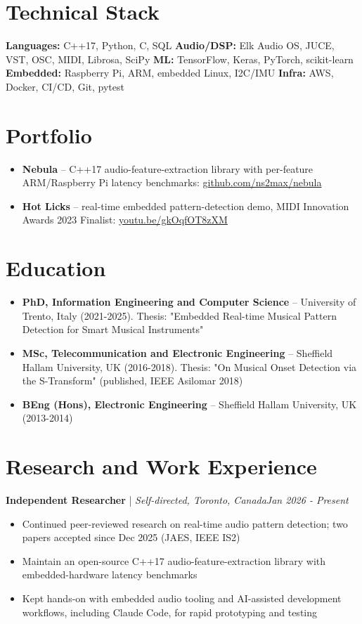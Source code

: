 \documentclass[11pt]{article}
\newenvironment{cvrole}[5]{%
  \par\noindent\textbf{\large #1} | \textit{\small #2, #3}\hfill \textit{\small #4 - #5}\par
  \begin{itemize}[leftmargin=2em, itemsep=-0.3em, topsep=-0.5em]%
}{%
  \end{itemize}\par\noindent\mbox{}\par\vspace{0.1em}%
}
\begin{document}
\section*{Technical Stack}
\textbf{Languages:} C++17, Python, C, SQL \quad
\textbf{Audio/DSP:} Elk Audio OS, JUCE, VST, OSC, MIDI, Librosa, SciPy \quad
\textbf{ML:} TensorFlow, Keras, PyTorch, scikit-learn \quad
\textbf{Embedded:} Raspberry Pi, ARM, embedded Linux, I2C/IMU \quad
\textbf{Infra:} AWS, Docker, CI/CD, Git, pytest

\section*{Portfolio}
\begin{itemize}[leftmargin=1.5em, itemsep=-0.2em]
    \item \textbf{Nebula} -- C++17 audio-feature-extraction library with per-feature ARM/Raspberry Pi latency benchmarks: \href{https://github.com/ns2max/nebula}{github.com/ns2max/nebula}
    \item \textbf{Hot Licks} -- real-time embedded pattern-detection demo, MIDI Innovation Awards 2023 Finalist: \href{https://youtu.be/gkOqfOT8zXM}{youtu.be/gkOqfOT8zXM}
\end{itemize}

\section*{Education}
\begin{itemize}[leftmargin=1.5em, itemsep=-0.2em]
    \item \textbf{PhD, Information Engineering and Computer Science} -- University of Trento, Italy (2021-2025). Thesis: "Embedded Real-time Musical Pattern Detection for Smart Musical Instruments"
    \item \textbf{MSc, Telecommunication and Electronic Engineering} -- Sheffield Hallam University, UK (2016-2018). Thesis: "On Musical Onset Detection via the S-Transform" (published, IEEE Asilomar 2018)
    \item \textbf{BEng (Hons), Electronic Engineering} -- Sheffield Hallam University, UK (2013-2014)
\end{itemize}

\section*{Research and Work Experience}

\begin{cvrole}{Independent Researcher}{Self-directed}{Toronto, Canada}{Jan 2026}{Present}
    \item Continued peer-reviewed research on real-time audio pattern detection; two papers accepted since Dec 2025 (JAES, IEEE IS2)
    \item Maintain an open-source C++17 audio-feature-extraction library with embedded-hardware latency benchmarks
    \item Kept hands-on with embedded audio tooling and AI-assisted development workflows, including Claude Code, for rapid prototyping and testing
\end{cvrole}
\end{document}
